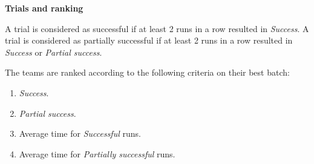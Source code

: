 {\bfseries Trials and ranking}

\smallskip

A trial is considered as successful if at least 2 runs in a row resulted in \textit{Success}. A trial is considered as
partially successful if at least 2 runs in a row resulted in \textit{Success} or \textit{Partial success}.

The teams are ranked according to the following criteria on their best batch:
\begin{enumerate}
\item \textit{Success}.
\item \textit{Partial success}.
\item Average time for \textit{Successful} runs.
\item Average time for \textit{Partially successful} runs.
\end{enumerate}

